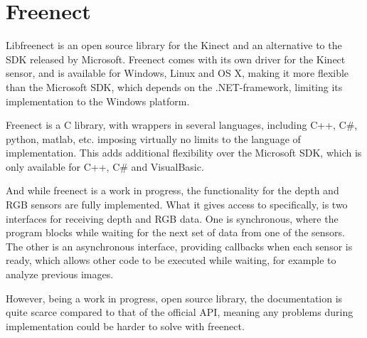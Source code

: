 \section{Freenect}

Libfreenect\cite{libfreenect} is an open source library for the Kinect and an alternative to the SDK released
by Microsoft. Freenect comes with its own driver for the Kinect sensor, and is available for Windows, Linux
and OS X, making it more flexible than the Microsoft SDK, which depends on the
.NET-framework\cite{kinectwindows},
limiting its implementation to the Windows platform.

Freenect is a C library, with wrappers in several languages, including C++, C\#, python, matlab, etc.
imposing virtually no limits to the language of implementation. This adds additional flexibility over
the Microsoft SDK, which is only available for C++, C\# and VisualBasic.

And while freenect is a work in progress, the functionality for the depth and RGB sensors are fully implemented.
What it gives access to specifically, is two interfaces for receiving depth and RGB data. One is synchronous, 
where the program blocks while waiting for the next set of data from one of the sensors. The other is an 
asynchronous interface, providing callbacks when each sensor is ready, which allows other code to be executed
while waiting, for example to analyze previous images.

However, being a work in progress, open source library, the documentation is quite scarce compared to
that of the official API, meaning any problems during implementation could be harder to solve with freenect.
